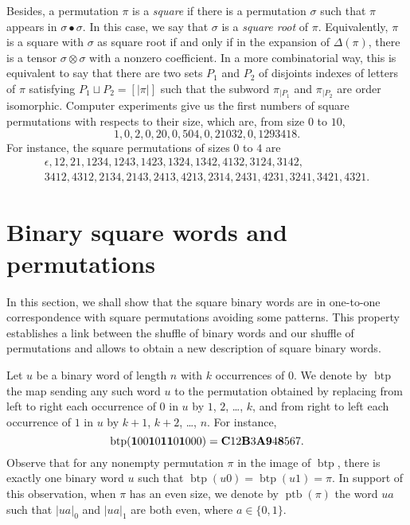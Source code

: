 \documentclass[a4paper,10pt]{llncs}
\DeclareMathOperator{\SHUFFLE}{\bullet}
\DeclareMathOperator{\BINTOPERM}{\mathrm{btp}}
\DeclareMathOperator{\PERMTOBIN}{\mathrm{ptb}}
\begin{document}
Besides, a permutation $\pi$ is a {\em square} if there is a
permutation $\sigma$ such that $\pi$ appears in $\sigma \SHUFFLE \sigma$.
In this case, we say that $\sigma$ is a {\em square root} of $\pi$.
Equivalently, $\pi$ is a square with $\sigma$ as square root if and only
if in the expansion of $\Delta(\pi)$, there is a tensor
$\sigma \otimes \sigma$ with a nonzero coefficient. In a more
combinatorial way, this is equivalent to say that there are two sets
$P_1$ and $P_2$ of disjoints indexes of letters of $\pi$ satisfying
$P_1 \sqcup P_2 = [|\pi|]$ such that the subword $\pi_{|P_1}$ and
$\pi_{|P_2}$ are order isomorphic. Computer experiments give us the
first numbers of square permutations with respects to their size, which
are, from size $0$ to $10$,
\begin{equation}
    1, 0, 2, 0, 20, 0, 504, 0, 21032, 0, 1293418.
\end{equation}
For instance, the square permutations of sizes $0$ to $4$ are
\begin{multline}
    \epsilon, 12, 21,
    1234, 1243, 1423, 1324, 1342, 4132, 3124, 3142, \\ 3412, 4312,
    2134, 2143, 2413, 4213, 2314, 2431, 4231, 3241, 3421, 4321.
\end{multline}
\medskip


\section{Binary square words and permutations}
\label{section:Binary square words and permutations}
In this section, we shall show that the square binary words are in
one-to-one correspondence with square permutations avoiding some
patterns. This property establishes a link between the shuffle of binary
words and our shuffle of permutations and allows to obtain a new
description of square binary words.
\medskip

Let $u$ be a binary word of length $n$ with $k$ occurrences of $0$.
We denote by $\BINTOPERM$ the map sending any such word $u$ to the
permutation obtained by replacing from left to right each occurrence of
$0$ in $u$ by $1$, $2$, \dots, $k$, and from right to left each
occurrence of $1$ in $u$ by $k + 1$, $k + 2$, \dots, $n$. For instance,
\begin{equation}
    \BINTOPERM({\bf 1}00{\bf 1}0{\bf 1}{\bf 1}0{\bf 1}000) =
    {\bf C} 12 {\bf B} 3 {\bf A} {\bf 9} 4 {\bf 8} 567.
\end{equation}
Observe that for any nonempty permutation $\pi$ in the image of
$\BINTOPERM$, there is exactly one binary word $u$ such that
$\BINTOPERM(u0) = \BINTOPERM(u1) = \pi$. In support of this observation,
when $\pi$ has an even size, we denote by $\PERMTOBIN(\pi)$ the word $ua$
such that $|ua|_0$ and $|ua|_1$ are both even, where $a \in \{0, 1\}$.
\medskip
\end{document}
